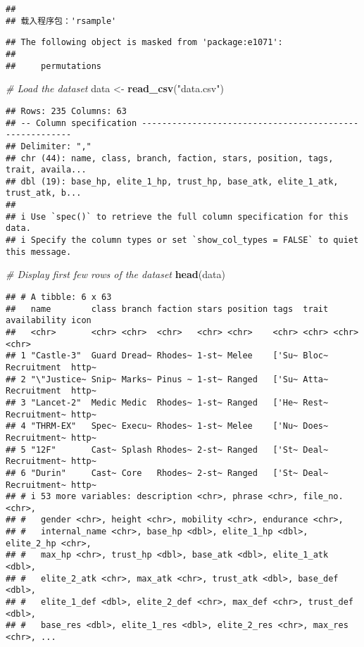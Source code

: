 \documentclass[
]{article}
\newenvironment{Shaded}{\begin{snugshade}}{\end{snugshade}}
\newcommand{\CommentTok}[1]{\textcolor[rgb]{0.56,0.35,0.01}{\textit{#1}}}
\newcommand{\FunctionTok}[1]{\textcolor[rgb]{0.13,0.29,0.53}{\textbf{#1}}}
\newcommand{\NormalTok}[1]{#1}
\newcommand{\OtherTok}[1]{\textcolor[rgb]{0.56,0.35,0.01}{#1}}
\newcommand{\StringTok}[1]{\textcolor[rgb]{0.31,0.60,0.02}{#1}}
\begin{document}
\begin{verbatim}
## 
## 载入程序包：'rsample'
\end{verbatim}

\begin{verbatim}
## The following object is masked from 'package:e1071':
## 
##     permutations
\end{verbatim}

\begin{Shaded}
\begin{Highlighting}[]
\CommentTok{\# Load the dataset}
\NormalTok{data }\OtherTok{\textless{}{-}} \FunctionTok{read\_csv}\NormalTok{(}\StringTok{"data.csv"}\NormalTok{)}
\end{Highlighting}
\end{Shaded}

\begin{verbatim}
## Rows: 235 Columns: 63
## -- Column specification --------------------------------------------------------
## Delimiter: ","
## chr (44): name, class, branch, faction, stars, position, tags, trait, availa...
## dbl (19): base_hp, elite_1_hp, trust_hp, base_atk, elite_1_atk, trust_atk, b...
## 
## i Use `spec()` to retrieve the full column specification for this data.
## i Specify the column types or set `show_col_types = FALSE` to quiet this message.
\end{verbatim}

\begin{Shaded}
\begin{Highlighting}[]
\CommentTok{\# Display first few rows of the dataset}
\FunctionTok{head}\NormalTok{(data)}
\end{Highlighting}
\end{Shaded}

\begin{verbatim}
## # A tibble: 6 x 63
##   name        class branch faction stars position tags  trait availability icon 
##   <chr>       <chr> <chr>  <chr>   <chr> <chr>    <chr> <chr> <chr>        <chr>
## 1 "Castle-3"  Guard Dread~ Rhodes~ 1-st~ Melee    ['Su~ Bloc~ Recruitment  http~
## 2 "\"Justice~ Snip~ Marks~ Pinus ~ 1-st~ Ranged   ['Su~ Atta~ Recruitment  http~
## 3 "Lancet-2"  Medic Medic  Rhodes~ 1-st~ Ranged   ['He~ Rest~ Recruitment~ http~
## 4 "THRM-EX"   Spec~ Execu~ Rhodes~ 1-st~ Melee    ['Nu~ Does~ Recruitment~ http~
## 5 "12F"       Cast~ Splash Rhodes~ 2-st~ Ranged   ['St~ Deal~ Recruitment~ http~
## 6 "Durin"     Cast~ Core   Rhodes~ 2-st~ Ranged   ['St~ Deal~ Recruitment~ http~
## # i 53 more variables: description <chr>, phrase <chr>, file_no. <chr>,
## #   gender <chr>, height <chr>, mobility <chr>, endurance <chr>,
## #   internal_name <chr>, base_hp <dbl>, elite_1_hp <dbl>, elite_2_hp <chr>,
## #   max_hp <chr>, trust_hp <dbl>, base_atk <dbl>, elite_1_atk <dbl>,
## #   elite_2_atk <chr>, max_atk <chr>, trust_atk <dbl>, base_def <dbl>,
## #   elite_1_def <dbl>, elite_2_def <chr>, max_def <chr>, trust_def <dbl>,
## #   base_res <dbl>, elite_1_res <dbl>, elite_2_res <chr>, max_res <chr>, ...
\end{verbatim}
\end{document}
